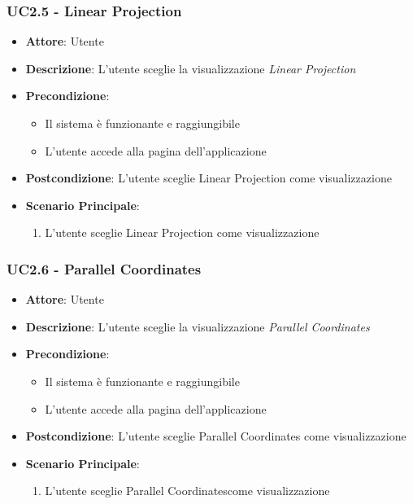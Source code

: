     \subsubsection{UC2.5 - Linear Projection}
    \label{uc2.5}
    
    \begin{itemize}
    \item \textbf{Attore}: Utente
    \item \textbf{Descrizione}: L'utente sceglie la visualizzazione \emph{Linear Projection}
    \item \textbf{Precondizione}:
    \begin{itemize}
        \item Il sistema è funzionante e raggiungibile
        \item L'utente accede alla pagina dell'applicazione
    \end{itemize}
    \item \textbf{Postcondizione}: L'utente sceglie Linear Projection come visualizzazione
    \item \textbf{Scenario Principale}: 
        \begin{enumerate}
            \item L'utente sceglie Linear Projection come visualizzazione
        \end{enumerate}
    \end{itemize}
    
    \subsubsection{UC2.6 - Parallel Coordinates}
    \label{uc2.6}
    
    \begin{itemize}
    \item \textbf{Attore}: Utente
    \item \textbf{Descrizione}: L'utente sceglie la visualizzazione \emph{Parallel Coordinates}
    \item \textbf{Precondizione}:
    \begin{itemize}
        \item Il sistema è funzionante e raggiungibile
        \item L'utente accede alla pagina dell'applicazione
    \end{itemize}
    \item \textbf{Postcondizione}: L'utente sceglie Parallel Coordinates come visualizzazione
    \item \textbf{Scenario Principale}: 
        \begin{enumerate}
            \item L'utente sceglie Parallel Coordinatescome visualizzazione
        \end{enumerate}
    \end{itemize}
    
  

